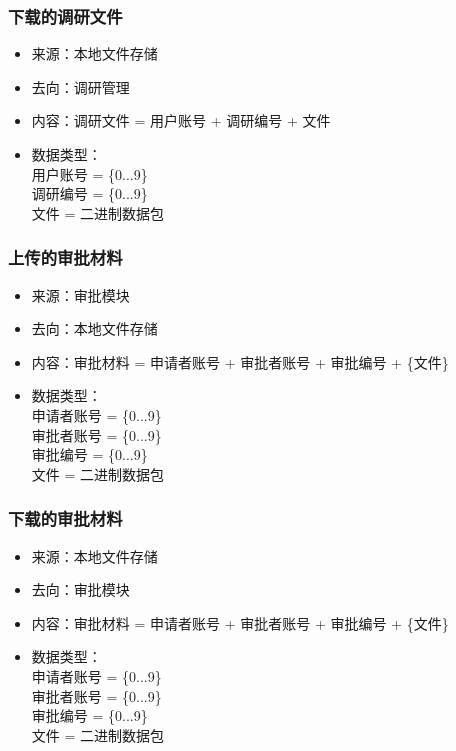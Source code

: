 {            \subsubsection{\color{red} 下载的调研文件}
            \begin{itemize}
            \item 来源：本地文件存储
            \item 去向：调研管理
            \item 内容：调研文件 = 用户账号 + 调研编号 + 文件
            \item 数据类型：\\
            用户账号 = \{0...9\}\\
            调研编号 = \{0...9\}\\
            文件 = 二进制数据包\\
            \end{itemize}

            \subsubsection{\color{red} 上传的审批材料}
            \begin{itemize}
            \item 来源：审批模块
            \item 去向：本地文件存储
            \item 内容：审批材料 = 申请者账号 + 审批者账号 + 审批编号 + \{文件\}
            \item 数据类型：\\
            申请者账号 = \{0...9\}\\
            审批者账号 = \{0...9\}\\
            审批编号 = \{0...9\}\\
            文件 = 二进制数据包\\
            \end{itemize}

            \subsubsection{\color{red} 下载的审批材料}
            \begin{itemize}
            \item 来源：本地文件存储
            \item 去向：审批模块
            \item 内容：审批材料 = 申请者账号 + 审批者账号 + 审批编号 + \{文件\}
            \item 数据类型：\\
            申请者账号 = \{0...9\}\\
            审批者账号 = \{0...9\}\\
            审批编号 = \{0...9\}\\
            文件 = 二进制数据包\\
            \end{itemize}

}
